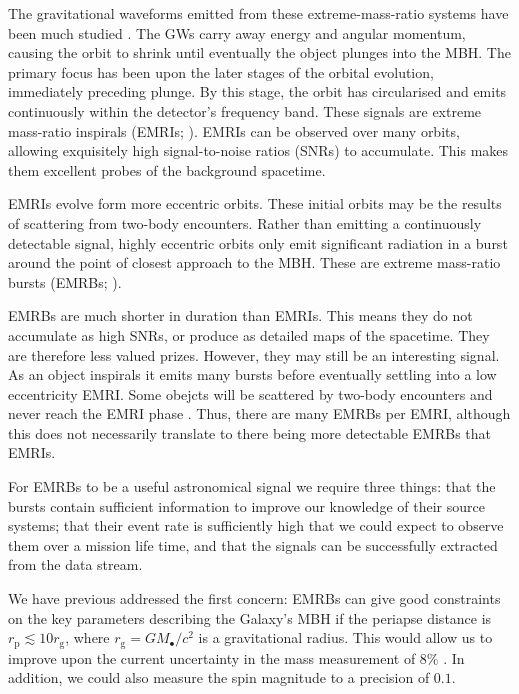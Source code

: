 \documentclass[useAMS,usedcolumn,usegraphicx,usenatbib]{mn2e}
\newcommand{\sub}[1]{\ensuremath{_\mathrm{#1}}}
\begin{document}
The gravitational waveforms emitted from these extreme-mass-ratio systems have been much studied \citep{Glampedakis2005, Barack2009}. The GWs carry away energy and angular momentum, causing the orbit to shrink until eventually the object plunges into the MBH. The primary focus has been upon the later stages of the orbital evolution, immediately preceding plunge. By this stage, the orbit has circularised and emits continuously within the detector's frequency band. These signals are extreme mass-ratio inspirals (EMRIs; \citealt{Amaro-Seoane2007}). EMRIs can be observed over many orbits, allowing exquisitely high signal-to-noise ratios (SNRs) to accumulate. This makes them excellent probes of the background spacetime.

EMRIs evolve form more eccentric orbits. These initial orbits may be the results of scattering from two-body encounters. Rather than emitting a continuously detectable signal, highly eccentric orbits only emit significant radiation in a burst around the point of closest approach to the MBH. These are extreme mass-ratio bursts (EMRBs; \citealt*{Rubbo2006}).

EMRBs are much shorter in duration than EMRIs. This means they do not accumulate as high SNRs, or produce as detailed maps of the spacetime. They are therefore less valued prizes. However, they may still be an interesting signal. As an object inspirals it emits many bursts before eventually settling into a low eccentricity EMRI. Some obejcts will be scattered by two-body encounters and never reach the EMRI phase \citep{Alexander2003}. Thus, there are many EMRBs per EMRI, although this does not necessarily translate to there being more detectable EMRBs that EMRIs.

For EMRBs to be a useful astronomical signal we require three things: that the bursts contain sufficient information to improve our knowledge of their source systems; that their event rate is sufficiently high that we could expect to observe them over a mission life time, and that the signals can be successfully extracted from the data stream.

We have previous addressed the first concern: EMRBs can give good constraints on the key parameters describing the Galaxy's MBH if the periapse distance is $r\sub{p} \lesssim 10 r\sub{g}$, where $r\sub{g} = GM_\bullet/c^2$ is a gravitational radius. This would allow us to improve upon the current uncertainty in the mass measurement of $8\%$ \citep{Gillessen2009}. In addition, we could also measure the spin magnitude to a precision of $0.1$.
\end{document}
